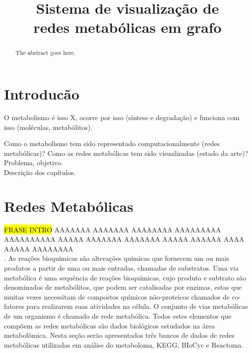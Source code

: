 \documentclass[conference]{IEEEtran}
\begin{document}
\title{Sistema de visualização de\\redes metabólicas em grafo}

\author{
}


\maketitle

\begin{abstract}
The abstract goes here.
\end{abstract}


\section{Introducão}

O metabolismo é isso X, ocorre por isso (síntese e degradação) e funciona com isso (moléculas, metabólitos).

Como o metabolismo tem sido representado computacionalmente (redes metabólicas)? Como as redes metabólicas tem sido visualizadas (estado da arte)? \\
Problema, objetivo. \\
Descrição dos capítulos.


\section{Redes Metabólicas}

\hl{FRASE INTRO} \indent AAAAAAA AAAAAAA  AAAAAAAA AAAAAAAAA AAAAAAAAAA AAAAA AAAAAAA AAAAAAA AAAAA AAAAAA AAAA AAAAA AAAAAAAA \\. As reações bioquímicas são alterações químicas que fornecem um ou mais produtos a partir de uma ou mais entradas, chamadas de substratos. Uma via metabólica é uma sequência de reações bioquímicas, cujo produto e subtrato são denominados de metabólitos, que podem ser catalisadas por enzimas, estas que muitas vezes necessitam de compostos químicos não-proteicos chamados de co-fatores para realizarem suas atividades na célula. O conjunto de vias metabólicas de um organismo é chamado de rede metabólica. Todos estes elementos que compõem as redes metabólicas são dados biológicos estudados na área metabolômica. Nesta seção serão apresentados três bancos de dados de redes metabólicas utilizadas em análise do metaboloma, KEGG, BIoCyc e Reactoma.
\end{document}
